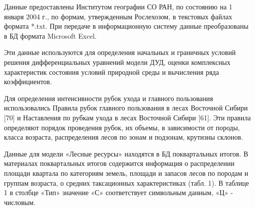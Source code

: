 Данные предоставлены Институтом географии
СО РАН, по состоянию на 1 января 2004 г., по формам,
утвержденным Рослехозом, в текстовых файлах
формата *.txt. При передаче в информационную систему
данные преобразованы в БД формата Microsoft Excel.

Эти данные используются для определения начальных
и граничных условий решения дифференциальных
уравнений модели ДУД, оценки комплексных характеристик
состояния условий природной среды и вычисления
ряда коэффициентов.

Для определения интенсивности рубок ухода
и главного пользования использовались Правила
рубок главного пользования в лесах Восточной
Сибири [70] и Наставления по рубкам ухода в лесах
Восточной Сибири [61]. Эти правила определяют
порядок проведения рубок, их объемы, в зависимости
от породы, класса возраста, распределения лесов
по зонам и подзонам, крутизны склонов.

Данные для модели «Лесные ресурсы» находятся в БД поквартальных итогов. В материалах поквартальных итогов содержится информация о распределении площади квартала по категориям земель, площади и запасов лесов по породам и группам возраста, о средних таксационных характеристиках (табл. 1). В таблице 1 в столбце «Тип» значение «С» соответствует символьным данным, «Ц» - числовым.
